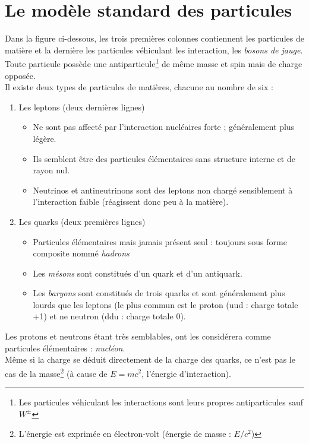 \documentclass	[11pt, a4paper, openany]{book}
\begin{document}
\section{Le modèle standard des particules}
Dans la figure ci-dessous, les trois premières colonnes contiennent les particules de matière et la dernière les particules véhiculant les interaction, les \textit{bosons de jauge}.\\
Toute particule possède une antiparticule\footnote{Les particules véhiculant les interactions sont leurs propres antiparticules sauf $W^\pm$} de même masse et spin mais de charge opposée.\\

Il existe deux types de particules de matières, chacune au nombre de six : 
\begin{enumerate}
\item Les leptons (deux dernières lignes)
\begin{itemize}
\item Ne sont pas affecté par l'interaction nucléaires forte ; généralement plus légère.
\item Ils semblent être des particules élémentaires sans structure interne et de rayon nul.
\item Neutrinos et antineutrinons sont des leptons non chargé sensiblement à l'interaction faible (réagissent donc peu à la matière).
\end{itemize} 
\item Les quarks (deux premières lignes)
\begin{itemize}
\item Particules élémentaires mais jamais présent seul : toujours sous forme composite nommé \textit{hadrons}
\item Les \textit{mésons} sont constitués d'un quark et d'un antiquark.
\item Les \textit{baryons} sont constitués de trois quarks et sont généralement plus lourds que les leptons (le plus commun est le proton (uud : charge totale +1) et ne neutron (ddu : charge totale 0).
\end{itemize}
\end{enumerate}
Les protons et neutrons étant très semblables, ont les considérera comme particules élémentaires : \textit{nucléon}.\\
Même si la charge se déduit directement de la charge des quarks, ce n'est pas le cas de la masse\footnote{L'énergie est exprimée en électron-volt (énergie de masse : $E/c^2$)} (à cause de $E = mc^2$, l'énergie d'interaction).\\
\end{document}
